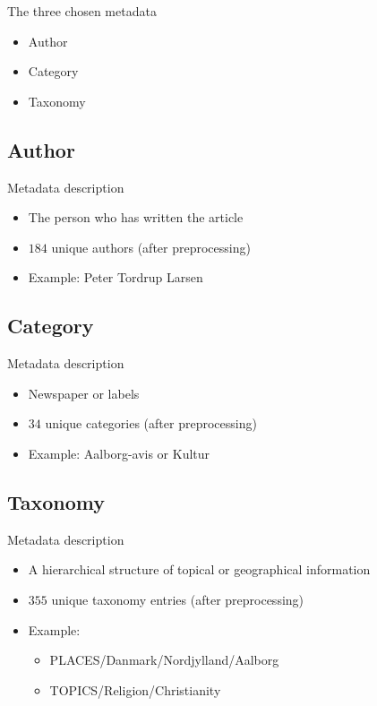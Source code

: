 \begin{frame}{\insertsection}{The three chosen metadata}
	\begin{itemize}
		\item Author
		\item Category
		\item Taxonomy
	\end{itemize}
\end{frame}

\subsection{Author}

\begin{frame}{\insertsubsection}{Metadata description}
	\begin{itemize}
		\item The person who has written the article
		\item $184$ unique authors (after preprocessing)
		\item Example: Peter Tordrup Larsen
	\end{itemize}
\end{frame}


\subsection{Category}

\begin{frame}{\insertsubsection}{Metadata description}
	\begin{itemize}
		\item Newspaper or labels
		\item $34$ unique categories (after preprocessing)
		\item Example: Aalborg-avis or Kultur
	\end{itemize}
\end{frame}


\subsection{Taxonomy}

\begin{frame}{\insertsubsection}{Metadata description}
	\begin{itemize}
		\item A hierarchical structure of topical or geographical information 
		\item $355$ unique taxonomy entries (after preprocessing)
		\item Example: 
		\begin{itemize}
			\item PLACES/Danmark/Nordjylland/Aalborg
			\item TOPICS/Religion/Christianity
		\end{itemize}
	\end{itemize}
\end{frame}

